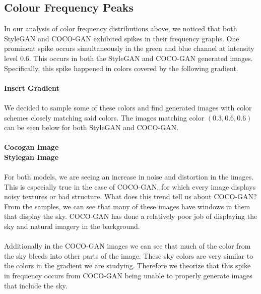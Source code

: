 \documentclass[12pt]{article}
\begin{document}
\begin{multicols*}{2}
        \subsection{Colour Frequency Peaks}
        In our analysis of color frequency distributions above, we noticed that both StyleGAN and COCO-GAN exhibited spikes in their frequency graphs.
        One prominent spike occurs simultaneously in the green and blue channel at intensity level 0.6.
        This occurs in both the StyleGAN and COCO-GAN generated images.
        Specifically, this spike happened in colors covered by the following gradient.
        \\\\
        \textbf{Insert Gradient}
        \\\\
        We decided to sample some of these colors and find generated images with color schemes closely matching said colors.
        The images matching color $(0.3, 0.6, 0.6)$ can be seen below for both StyleGAN and COCO-GAN.
        \\\\
        \textbf{Cocogan Image}\\
        \textbf{Stylegan Image}
        \\\\
        For both models, we are seeing an increase in noise and distortion in the images.
        This is especially true in the case of COCO-GAN, for which every image displays noisy textures or bad structure.
        What does this trend tell us about COCO-GAN?
        From the samples, we can see that many of these images have windows in them that display the sky.
        COCO-GAN has done a relatively poor job of displaying the sky and natural imagery in the background.
        \\\\
        Additionally in the COCO-GAN images we can see that much of the color from the sky bleeds into other parts of the image.
        These sky colors are very similar to the colors in the gradient we are studying.
        Therefore we theorize that this spike in frequency occurs from COCO-GAN being unable to properly generate images that include the sky.

\end{multicols*}
\end{document}
